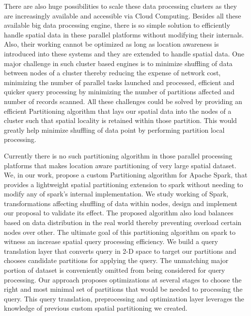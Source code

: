 \documentclass[article,type=msc,colorback,10pt,accentcolor=tud1d]{tudthesis}
\begin{document}
		There are also huge possibilities to scale these data processing clusters as they are increasingly available and accessible via Cloud Computing. Besides all these available big data processing engine, there is so simple solution to efficiently handle spatial data in these parallel platforms without modifying their internals. Also, their working cannot be optimized as long as location awareness is introduced into these systems and they are extended to handle spatial data. One major challenge in such cluster based engines is to minimize shuffling of data between nodes of a cluster thereby reducing the expense of network cost, minimizing the number of parallel tasks launched and processed, efficient and quicker query processing by  minimizing the number of partitions affected and number of records scanned. All these challenges could be solved by providing an efficient Partitioning algorithm that lays our spatial data into the nodes of a cluster such that spatial locality is retained within those partition. This would greatly help minimize shuffling of data point by performing partition local processing. 
		
		Currently there is no such partitioning algorithm in those parallel processing platforms that makes location aware partitioning of very large spatial dataset. We, in our work,  propose a custom Partitioning algorithm for Apache Spark, that provides a lightweight spatial partitioning extension to spark without needing to modify any of spark's internal implementation. We study working of Spark, transformations affecting shuffling of data within nodes, design and implement our proposal to validate its effect. The proposed algorithm also load balances based on data distribution in the real world thereby preventing overload certain nodes over other. The ultimate goal of this partitioning algorithm on spark to witness an increase spatial query processing efficiency. We build a query translation layer that converts query in 2-D space to target our partitions and chooses candidate partitions for applying the query. The unmatching major portion of dataset is conveniently omitted from being considered for query processing. Our approach proposes optimizations at several stages to choose the right and most minimal set of partitions that would be needed to processing the query. This query translation, preprocessing and optimization layer leverages the knowledge of previous custom spatial partitioning we created.  
		
		\clearpage
\end{document}
